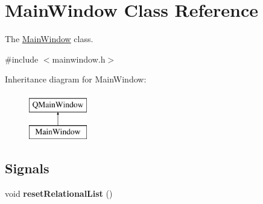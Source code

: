 \hypertarget{class_main_window}{}\section{Main\+Window Class Reference}
\label{class_main_window}


The \mbox{\hyperlink{class_main_window}{Main\+Window}} class.  




{\ttfamily \#include $<$mainwindow.\+h$>$}

Inheritance diagram for Main\+Window\+:\begin{figure}[H]
\begin{center}
\leavevmode
\includegraphics[height=2.000000cm]{class_main_window}
\end{center}
\end{figure}
\subsection*{Signals}
\begin{DoxyCompactItemize}
\item 
\mbox{\label{class_main_window_a46ebd786b1aeb0ef026f0a3f32dd9f3d}} 
void {\bfseries reset\+Relational\+List} ()
\end{DoxyCompactItemize}
